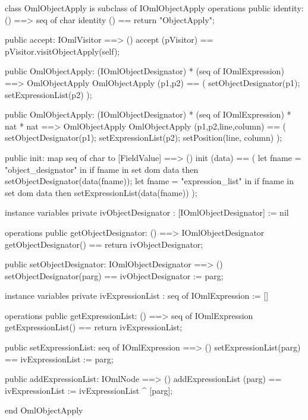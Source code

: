 \begin{vdm_al}
class OmlObjectApply is subclass of IOmlObjectApply
operations
  public identity: () ==> seq of char
  identity () == return "ObjectApply";

  public accept: IOmlVisitor ==> ()
  accept (pVisitor) == pVisitor.visitObjectApply(self);

  public OmlObjectApply:
    (IOmlObjectDesignator) *
    (seq of IOmlExpression) ==> OmlObjectApply
  OmlObjectApply (p1,p2) == 
    ( setObjectDesignator(p1);
      setExpressionList(p2) );

  public OmlObjectApply:
    (IOmlObjectDesignator) *
    (seq of IOmlExpression) *
    nat *
    nat ==> OmlObjectApply
  OmlObjectApply (p1,p2,line,column) == 
    ( setObjectDesignator(p1);
      setExpressionList(p2);
      setPosition(line, column) );

  public init: map seq of char to [FieldValue] ==> ()
  init (data) ==
    ( let fname = "object_designator" in
        if fname in set dom data
        then setObjectDesignator(data(fname));
      let fname = "expression_list" in
        if fname in set dom data
        then setExpressionList(data(fname)) );

instance variables
  private ivObjectDesignator : [IOmlObjectDesignator] := nil

operations
  public getObjectDesignator: () ==> IOmlObjectDesignator
  getObjectDesignator() == return ivObjectDesignator;

  public setObjectDesignator: IOmlObjectDesignator ==> ()
  setObjectDesignator(parg) == ivObjectDesignator := parg;

instance variables
  private ivExpressionList : seq of IOmlExpression := []

operations
  public getExpressionList: () ==> seq of IOmlExpression
  getExpressionList() == return ivExpressionList;

  public setExpressionList: seq of IOmlExpression ==> ()
  setExpressionList(parg) == ivExpressionList := parg;

  public addExpressionList: IOmlNode ==> ()
  addExpressionList (parg) == ivExpressionList := ivExpressionList ^ [parg];

end OmlObjectApply
\end{vdm_al}

